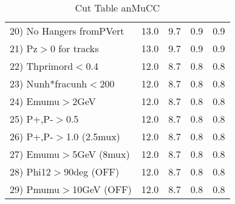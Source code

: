 \begin{table}[h!]
\begin{tabular}{||l||r|r|r|r||}
 20) No Hangers fromPVert &        13.0 &         9.7 &         0.9 &         0.9 \\
 21) Pz$>$0 for tracks    &        13.0 &         9.7 &         0.9 &         0.9 \\
 22) Thprimord$<$0.4      &        12.0 &         8.7 &         0.8 &         0.8 \\
 23) Nunh*fracunh$<$200   &        12.0 &         8.7 &         0.8 &         0.8 \\
 24) Emumu$>$2GeV         &        12.0 &         8.7 &         0.8 &         0.8 \\
 25) P+,P-$>$0.5          &        12.0 &         8.7 &         0.8 &         0.8 \\
 26) P+,P-$>$1.0 (2.5mux) &        12.0 &         8.7 &         0.8 &         0.8 \\
 27) Emumu$>$5GeV  (8mux) &        12.0 &         8.7 &         0.8 &         0.8 \\
 28) Phi12$>$90deg  (OFF) &        12.0 &         8.7 &         0.8 &         0.8 \\
 29) Pmumu$>$10GeV  (OFF) &        12.0 &         8.7 &         0.8 &         0.8 \\
 \hline
 \hline
 \end{tabular}
 \caption{Cut Table  anMuCC }
 \label{tab-cut_anmcc}
 \end{table}

